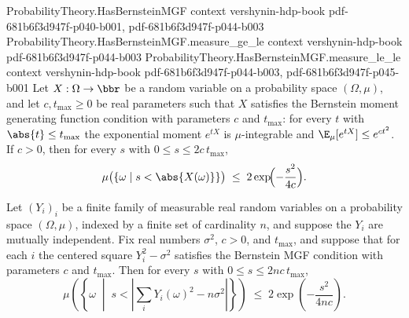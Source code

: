 \begin{lemma}
\label{ProbabilityTheory.HasBernsteinMGF.measure_abs_gt_le}
\leanok
{}
\proofstep
  {ProbabilityTheory.HasBernsteinMGF}
  {context}
  {vershynin-hdp-book}
  {pdf-681b6f3d947f-p040-b001,
    pdf-681b6f3d947f-p044-b003}
\proofstep
  {ProbabilityTheory.HasBernsteinMGF.measure_ge_le}
  {context}
  {vershynin-hdp-book}
  {pdf-681b6f3d947f-p044-b003}
\proofstep
  {ProbabilityTheory.HasBernsteinMGF.measure_le_le}
  {context}
  {vershynin-hdp-book}
  {pdf-681b6f3d947f-p044-b003,
    pdf-681b6f3d947f-p045-b001}
Let $X : \Omega \to \bbr$ be a random variable on a probability space $(\Omega, \mu)$,
and let $c, t_{\max} \ge 0$ be real parameters such that $X$ satisfies the Bernstein
moment generating function condition with parameters $c$ and $t_{\max}$: for every $t$
with $\abs{t} \le t_{\max}$ the exponential moment $e^{tX}$ is $\mu$-integrable and
$\E_\mu[e^{tX}] \le e^{c t^2}$. If $c > 0$, then for every $s$ with $0 \le s \le 2 c\,
t_{\max}$,
\[
\mu\bigl(\{\omega \mid s < \abs{X(\omega)}\}\bigr) \;\le\;
2\exp\!\Bigl(-\frac{s^2}{4c}\Bigr).
\]
\end{lemma}

\begin{lemma}
\label{ProbabilityTheory.centered_squared_iid_tail}
\leanok
{}
Let $(Y_i)_{i}$ be a finite family of measurable real random variables on a probability
space $(\Omega, \mu)$, indexed by a finite set of cardinality $n$, and suppose the $Y_i$
are mutually independent. Fix real numbers $\sigma^2$, $c > 0$, and $t_{\max}$, and
suppose that for each $i$ the centered square $Y_i^2 - \sigma^2$ satisfies the Bernstein
MGF condition with parameters $c$ and $t_{\max}$. Then for every $s$ with $0 \le s \le 2
n c\, t_{\max}$,
\[
  \mu\!\left(\left\{\omega \;\middle|\;
    s < \left|\sum_{i} Y_i(\omega)^2 - n\sigma^2\right|\right\}\right)
  \;\le\;
  2\exp\!\left(-\frac{s^2}{4 n c}\right).
\]
\end{lemma}
